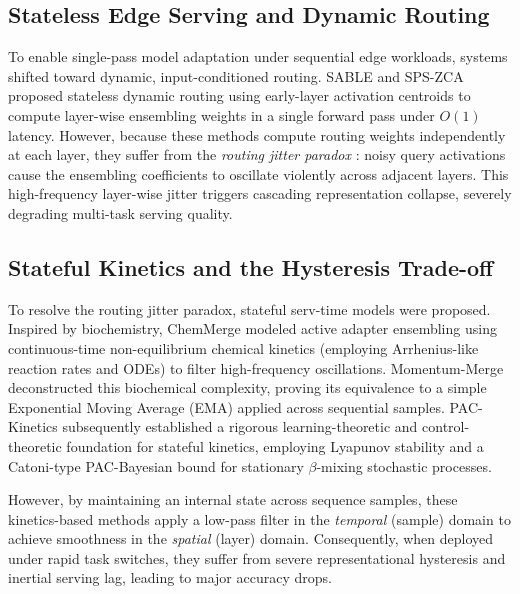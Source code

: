 \subsection{Stateless Edge Serving and Dynamic Routing}
To enable single-pass model adaptation under sequential edge workloads, systems shifted toward dynamic, input-conditioned routing. SABLE \cite{sable_2025} and SPS-ZCA \cite{sps_zca_2025} proposed stateless dynamic routing using early-layer activation centroids to compute layer-wise ensembling weights in a single forward pass under $O(1)$ latency. However, because these methods compute routing weights independently at each layer, they suffer from the \emph{routing jitter paradox} \cite{chemmerge_2026}: noisy query activations cause the ensembling coefficients to oscillate violently across adjacent layers. This high-frequency layer-wise jitter triggers cascading representation collapse, severely degrading multi-task serving quality.

\subsection{Stateful Kinetics and the Hysteresis Trade-off}
To resolve the routing jitter paradox, stateful serv-time models were proposed. Inspired by biochemistry, ChemMerge \cite{chemmerge_2026} modeled active adapter ensembling using continuous-time non-equilibrium chemical kinetics (employing Arrhenius-like reaction rates and ODEs) to filter high-frequency oscillations. Momentum-Merge \cite{momentum_merge_2026} deconstructed this biochemical complexity, proving its equivalence to a simple Exponential Moving Average (EMA) applied across sequential samples. PAC-Kinetics \cite{pac_kinetics_2026} subsequently established a rigorous learning-theoretic and control-theoretic foundation for stateful kinetics, employing Lyapunov stability and a Catoni-type PAC-Bayesian bound for stationary $\beta$-mixing stochastic processes. 

However, by maintaining an internal state across sequence samples, these kinetics-based methods apply a low-pass filter in the \emph{temporal} (sample) domain to achieve smoothness in the \emph{spatial} (layer) domain. Consequently, when deployed under rapid task switches, they suffer from severe representational hysteresis and inertial serving lag, leading to major accuracy drops.

